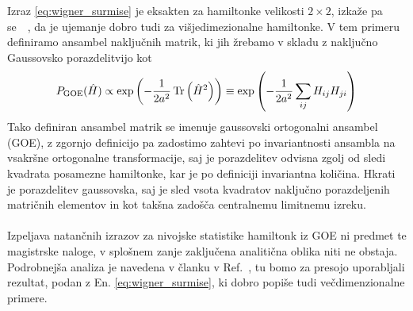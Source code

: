 { Izraz \eqref{eq:wigner_surmise} je eksakten za hamiltonke velikosti $2\times2$, izkaže pa se~\cite{abanin2018ergodicity}~\cite{atas2013distribution}, da je ujemanje dobro tudi za višjedimezionalne hamiltonke. V tem primeru definiramo ansambel naključnih matrik, ki jih žrebamo v skladu z naključno Gaussovsko porazdelitvijo kot
 \begin{equation}
 P_\mathrm{GOE}(\hat{H})\propto \exp\left(-\frac{1}{2a^2}\mathop{\rm Tr}\left(\hat{H}^2\right) \right) \equiv \exp\left(-\frac{1}{2a^2}\sum\limits_{ij}H_{ij}H_{ji} \right)
 \end{equation}
 Tako definiran ansambel matrik se imenuje gaussovski ortogonalni ansambel (GOE), z zgornjo definicijo pa zadostimo zahtevi po invariantnosti ansambla na vsakršne ortogonalne transformacije, saj je porazdelitev odvisna zgolj od sledi kvadrata posamezne hamiltonke, kar je po definiciji invariantna količina. Hkrati je porazdelitev gaussovska, saj je sled vsota kvadratov naključno porazdeljenih matričnih elementov in kot takšna zadošča centralnemu limitnemu izreku. \\\\Izpeljava natančnih izrazov za nivojske statistike hamiltonk iz GOE ni predmet te magistrske naloge, v splošnem zanje zaključena analitična oblika niti ne obstaja. Podrobnejša analiza je navedena v članku v Ref.~\cite{atas2013distribution}, tu bomo za presojo uporabljali rezultat, podan z En. \eqref{eq:wigner_surmise}, ki dobro popiše tudi večdimenzionalne primere. 
}
